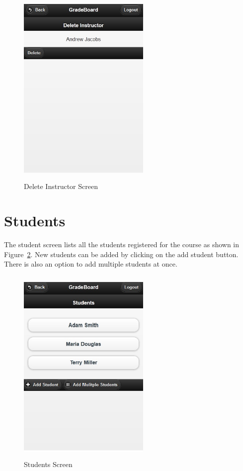 \vspace{3em}
\begin{figure}[H]
\begin{center}
\includegraphics[height=3.8in,width=2.5in]{images/deleteinstructor_screen.jpg}
\caption{Delete Instructor Screen}
\label{fig:deleteinstructor_screen}
\end{center}
\end{figure}

\newpage
\section{Students}
The student screen lists all the students registered for the course as shown in Figure~\ref{fig:students_screen}. New students can be added by clicking on the add student button. There is also an option to add multiple students at once.

\vspace{3em}
\begin{figure}[H]
\begin{center}
\includegraphics[height=3.8in,width=2.5in]{images/students_screen.jpg}
\caption{Students Screen}
\label{fig:students_screen}
\end{center}
\end{figure}

